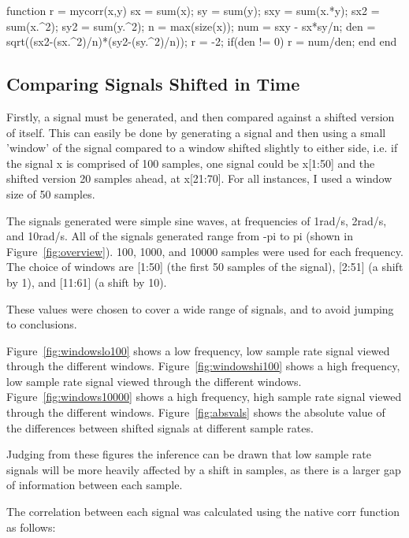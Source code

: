 \begin{Matlab}
function r = mycorr(x,y)
	sx  = sum(x);
	sy  = sum(y);
	sxy = sum(x.*y);    %
	sx2 = sum(x.^2);    %
	sy2 = sum(y.^2);
	n   = max(size(x)); %
	num = sxy - sx*sy/n;
	den = sqrt((sx2-(sx.^2)/n)*(sy2-(sy.^2)/n));
	r = -2; %
	if(den != 0)
		r = num/den;
	end
end
\end{Matlab}

\subsection{Comparing Signals Shifted in Time}

Firstly, a signal must be generated, and then compared against a shifted version of itself. This can easily be done by generating a signal and then using a small 'window' of the signal compared to a window shifted slightly to either side, i.e. if the signal x is comprised of 100 samples, one signal could be x[1:50] and the shifted version 20 samples ahead, at x[21:70]. For all instances, I used a window size of 50 samples.

The signals generated were simple sine waves, at frequencies of 1rad/s, 2rad/s, and 10rad/s. All of the signals generated range from -pi to pi (shown in Figure~\ref{fig:overview}). 100, 1000, and 10000 samples were used for each frequency.  The choice of windows are [1:50] (the first 50 samples of the signal), [2:51] (a shift by 1), and [11:61] (a shift by 10). 

These values were chosen to cover a wide range of signals, and to avoid jumping to conclusions.

Figure~\ref{fig:windowslo100} shows a low frequency, low sample rate signal viewed through the different windows. Figure~\ref{fig:windowshi100} shows a high frequency, low sample rate signal viewed through the different windows. Figure~\ref{fig:windows10000} shows a high frequency, high sample rate signal viewed through the different windows. Figure~\ref{fig:absvals} shows the absolute value of the differences between shifted signals at different sample rates.

Judging from these figures the inference can be drawn that low sample rate signals will be more heavily affected by a shift in samples, as there is a larger gap of information between each sample. 

The correlation between each signal was calculated using the native corr function as follows:

